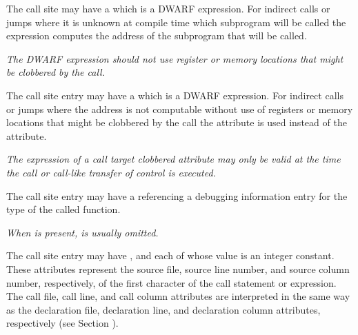 The call site may have a 
\DWATcalltargetDEFN{}
 which is
a DWARF expression.  For indirect calls or jumps where it is unknown at
compile time which subprogram will be called the expression computes the
address of the subprogram that will be called.  

\textit{The DWARF expression should
not use register or memory locations that might be clobbered by the call.}

The call site entry may have a 
\DWATcalltargetclobberedDEFN{}
which is a DWARF expression.  For indirect calls or jumps where the
address is not computable without use of registers or memory locations that
might be clobbered by the call the \DWATcalltargetclobberedNAME{}
attribute is used instead of the \DWATcalltarget{} attribute.

\textit{The expression of a call target clobbered attribute may only be 
valid at the time the call or call-like transfer of control is executed.}

The call site entry may have a \DWATtypeDEFN{}
referencing a debugging information entry for the type of the called function.  

\textit{When \DWATcallorigin{} is present, \DWATtypeNAME{} is usually omitted.}

The call site entry may have 
\DWATcallfileDEFN{}, 
\DWATcalllineDEFN{} and 
\DWATcallcolumnDEFN{} 
each of whose value is an integer constant.
These attributes represent the source file, source line number, and source
column number, respectively, of the first character of the call statement or
expression.  The call file, call line, and call column attributes are
interpreted in the same way as the declaration file, declaration
line, and declaration column attributes, respectively 
(see Section ).

